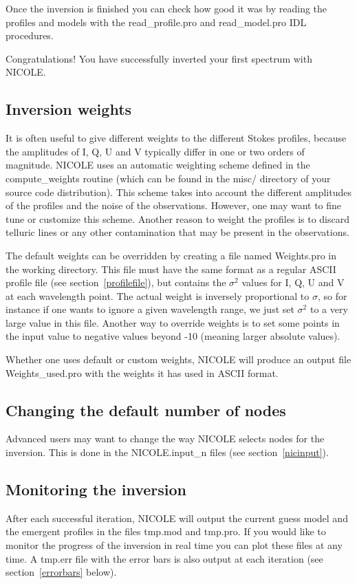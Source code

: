 Once the inversion is finished you can check how good it was by
reading the profiles and models with the read\_profile.pro and
read\_model.pro IDL procedures.

Congratulations! You have successfully inverted your first spectrum
with NICOLE.

\subsection{Inversion weights}

It is often useful to give different weights to the different Stokes
profiles, because the amplitudes of I, Q, U and V typically differ in
one or two orders of magnitude. NICOLE uses an automatic weighting
scheme defined in the compute\_weights routine (which can be found in
the misc/ directory of your source code distribution). This scheme
takes into account the different amplitudes of the profiles and the
noise of the observations. However, one may want to fine tune or
customize this scheme. Another reason to weight the profiles is to
discard telluric lines or any other contamination that may be present
in the observations.

The default weights can be overridden by creating a file named
Weights.pro in the working directory. This file must have the same
format as a regular ASCII profile file (see
section~\ref{profilefile}), but contains the $\sigma^2$ values for I,
Q, U and V at each wavelength point. The actual weight is inversely
proportional to $\sigma$, so for instance if one wants to ignore a
given wavelength range, we just set $\sigma^2$ to a very large value
in this file. Another way to override weights is to set some points in
the input value to negative values beyond -10 (meaning larger absolute
values). 

Whether one uses default or custom weights, NICOLE will produce an
output file Weights\_used.pro with the weights it has used in ASCII
format.


\subsection{Changing the default number of nodes}

Advanced users may want to change the way NICOLE selects nodes for the
inversion. This is done in the NICOLE.input\_n files (see section~\ref{nicinput}). 


\subsection{Monitoring the inversion}
After each successful iteration, NICOLE will output the current guess 
model and the emergent profiles in the files tmp.mod and tmp.pro. 
If you would like to monitor the progress of the
inversion in real time you can plot these files at any time.
A tmp.err file with the error bars is also output at each iteration
(see section~\ref{errorbars} below).


